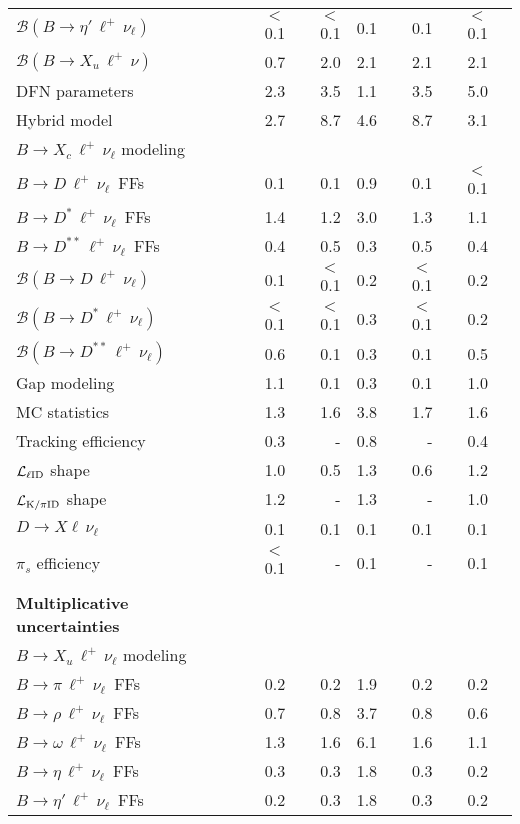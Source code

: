 \documentclass[twocolumn,aps,prd,superscriptaddress,nofootinbib,floatfix,preprintnumbers,a4]{revtex4-1}
\newcommand{\bulnu}{\ensuremath{B \to X_u \, \ell^+\, \nu_{\ell}}\xspace}
\newcommand{\bclnu}{\ensuremath{B \to X_c \, \ell^+\, \nu_{\ell}}\xspace}
\newcommand{\bpilnu}{\ensuremath{B \to \pi \, \ell^+\,\nu_{\ell}}\xspace}
\newcommand{\brholnu}{\ensuremath{B \to \rho \, \ell^+\,\nu_{\ell}}\xspace}
\newcommand{\bomegalnu}{\ensuremath{B \to \omega \, \ell^+\,\nu_{\ell}}\xspace}
\newcommand{\betalnu}{\ensuremath{B \to \eta \, \ell^+\,\nu_{\ell}}\xspace}
\newcommand{\betaplnu}{\ensuremath{B \to \eta' \, \ell^+\,\nu_{\ell}}\xspace}
\newcommand{\bdlnu}{\ensuremath{B \to D \, \ell^+\,\nu_{\ell}}\xspace}
\newcommand{\bdslnu}{\ensuremath{B \to D^* \, \ell^+\,\nu_{\ell}}\xspace}
\newcommand{\bddslnu}{\ensuremath{B \to D^{**} \, \ell^+\,\nu_{\ell}}\xspace}
\begin{document}
\begin{table}[t!]
\begin{tabular}{lrrrrrr}
 \qquad $\mathcal{B}(\betaplnu)$ & $<$0.1 & $<$0.1 & 0.1& 0.1 & $<$0.1 \\
 \qquad $\mathcal{B}(B \to X_u \, \ell^+ \, \nu)$  & 0.7 & 2.0 & 2.1& 2.1 & 2.1 \\
 \qquad DFN parameters& 2.3 & 3.5 & 1.1& 3.5 & 5.0 \\
 \qquad Hybrid model & 2.7 & 8.7 & 4.6& 8.7 & 3.1 \\
  \quad \bclnu modeling& \\
 \qquad \bdlnu\ FFs & 0.1 & 0.1 & 0.9& 0.1 & $<$0.1 \\
 \qquad \bdslnu\ FFs & 1.4 & 1.2 & 3.0& 1.3 & 1.1 \\
 \qquad \bddslnu\ FFs & 0.4 & 0.5 & 0.3& 0.5  & 0.4 \\
 \qquad $\mathcal{B}(\bdlnu)$ & 0.1 & $<$0.1 & 0.2& $<$0.1 & 0.2 \\
 \qquad $\mathcal{B}(\bdslnu)$ & $<$0.1 & $<$0.1 & 0.3& $<$0.1 & 0.2 \\
 \qquad $\mathcal{B}(\bddslnu)$ & 0.6 & 0.1 & 0.3& 0.1 & 0.5 \\
 \qquad Gap modeling & 1.1 & 0.1 & 0.3& 0.1 & 1.0 \\
 \quad MC statistics  & 1.3 & 1.6 & 3.8 & 1.7 & 1.6 \\ 
 \quad Tracking efficiency & 0.3 & - & 0.8 & - & 0.4   \\
 \quad $\mathcal{L}_{\rm \ell ID}$ shape & 1.0 & 0.5& 1.3 & 0.6 & 1.2 \\
 \quad $\mathcal{L}_{\rm K/\pi ID}$ shape & 1.2 & - & 1.3 & - & 1.0 \\
 \quad $D \to X \ell \, \nu_\ell$ &  0.1 & 0.1& 0.1 & 0.1 & 0.1 \\ 
 \quad $\pi_s$ efficiency & $<$0.1 & - & 0.1 & - & 0.1 \\
  \\
  {\bf Multiplicative uncertainties}  \\
 \quad \bulnu modeling & \\
 \qquad \bpilnu\ FFs & 0.2 & 0.2 & 1.9& 0.2 & 0.2 \\
 \qquad \brholnu\ FFs & 0.7 & 0.8 & 3.7 & 0.8 & 0.6 \\
 \qquad \bomegalnu\ FFs & 1.3 & 1.6 & 6.1 & 1.6 & 1.1 \\
 \qquad \betalnu\ FFs  & 0.3 & 0.3 & 1.8 & 0.3 & 0.2\\
 \qquad \betaplnu\ FFs & 0.2 & 0.3 & 1.8 & 0.3 & 0.2 \\

\end{tabular}
\end{table}
\end{document}
